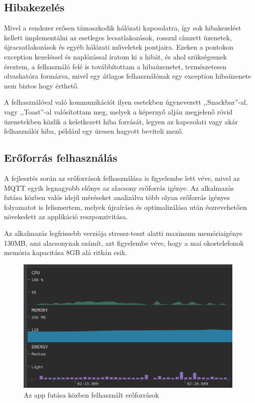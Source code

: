 \documentclass[
]{thesis-ekf}
\theoremstyle{definition}
\theoremstyle{remark}
\begin{document}
\subsection{Hibakezelés}
Mivel a rendszer erősen támaszkodik hálózati kapcsolatra, így sok hibakezelést kellett implementálni az esetleges
lecsatlakozások, rosszul címzett üzenetek, újracsatlakozások és egyéb hálózati műveletek pontjaira. Ezeken a pontokon
exception kezeléssel és naplózással íratom ki a hibát, és ahol szükségesnek éreztem, a felhasználó felé is továbbítottam
a hibaüzenetet, természetesen olvashatóra formázva, mivel egy átlagos felhasználónak egy exception hibaüzenete
nem biztos hogy érthető. 

A felhasználóval való kommunikációt ilyen esetekben úgynevezett ,,Snackbar''-al, vagy ,,Toast''-al
valósítottam meg, melyek a képernyő alján megjelenő rövid üzenetekben közlik a keletkezett hiba forrását, legyen az
kapcsolati vagy akár felhasználói hiba, például egy üresen hagyott beviteli mező.

\subsection{Erőforrás felhasználás}
A fejlesztés során az erőforrások felhasználása is figyelembe lett véve, mivel az MQTT egyik legnagyobb előnye
az alacsony erőforrás igénye. Az alkalmazás  futása közben valós idejű méréseket analizálva több olyan
erőforrás igényes folyamatot is felismertem, melyek újraírása és optimalizálása után észrevehetően növekedett
az applikáció reszponzivitása.

Az alkalmazás legfrissebb verziója stressz-teszt alatti maximum memóriaigénye 130MB, ami alacsonynak számít, azt
figyelembe véve, hogy a mai okostelefonok memória kapacitása 8GB alá ritkán esik.
\begin{figure}[h]
	\centering
	\label{profiler}
	\includegraphics{images/profiler.png}
	\caption{Az app futása közben felhasznált erőforrások}
\end{figure}
\end{document}
